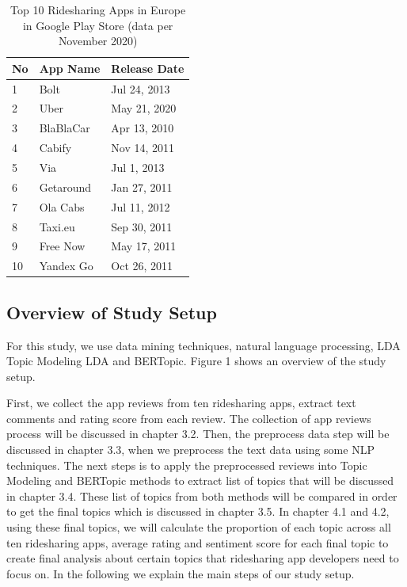 \documentclass[12pt]{article}
\begin{document}
\begin{table}[h]
\centering
\caption{Top 10 Ridesharing Apps in Europe in Google Play Store (data per November 2020)}
\begin{tabular}{lll}
\hline
\textbf{No} & \textbf{App Name} & \textbf{Release Date}  \\
\hline
1           & Bolt              & Jul 24, 2013           \\
2           & Uber              & May 21, 2020           \\
3           & BlaBlaCar         & Apr 13, 2010           \\
4           & Cabify            & Nov 14, 2011           \\
5           & Via               & Jul 1, 2013            \\
6           & Getaround         & Jan 27, 2011           \\
7           & Ola Cabs          & Jul 11, 2012           \\
8           & Taxi.eu           & Sep 30, 2011           \\
9           & Free Now          & May 17, 2011           \\
10          & Yandex Go         & Oct 26, 2011       \\
\hline
\end{tabular}
\label{tab:top10_appstore}
\end{table}


\newpage

\subsection{Overview of Study Setup}
For this study, we use data mining techniques, natural language processing, LDA Topic Modeling LDA and BERTopic. Figure 1 shows an overview of the study setup. 

First, we collect the app reviews from ten ridesharing apps, extract text comments and rating score from each review. The collection of app reviews process will be discussed in chapter 3.2. Then, the preprocess data step will be discussed in chapter 3.3, when we preprocess the text data using some NLP techniques. The next steps is to apply the preprocessed reviews into Topic Modeling and BERTopic methods to extract list of topics that will be discussed in chapter 3.4. These list of topics from both methods will be compared in order to get the final topics which is discussed in chapter 3.5. In chapter 4.1 and 4.2, using these final topics, we will calculate the proportion of each topic across all ten ridesharing apps, average rating and sentiment score for each final topic to create final analysis about certain topics that ridesharing app developers need to focus on. In the following we explain the main steps of our study setup.
\end{document}
